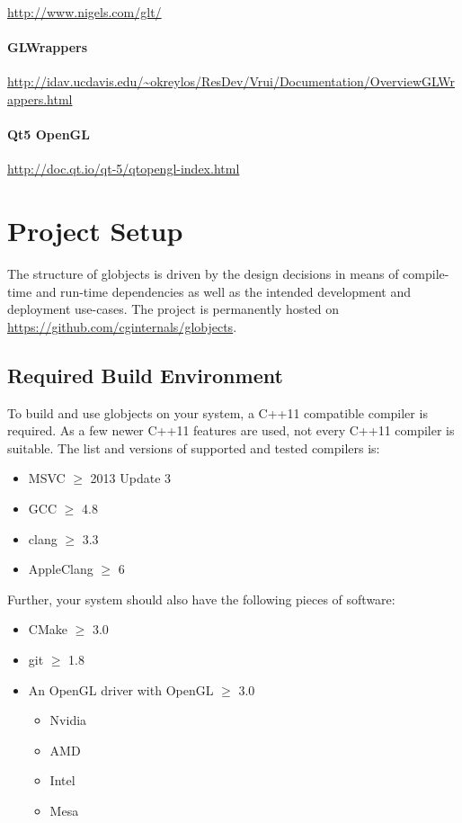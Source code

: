 \documentclass{article}
\begin{document}
\url{http://www.nigels.com/glt/}

\paragraph{GLWrappers}

\url{http://idav.ucdavis.edu/~okreylos/ResDev/Vrui/Documentation/OverviewGLWrappers.html}

\paragraph{Qt5 OpenGL}

\url{http://doc.qt.io/qt-5/qtopengl-index.html}

\section{Project Setup}

The structure of globjects is driven by the design decisions in means of compile-time and run-time dependencies as well as the intended development and deployment use-cases. The project is permanently hosted on \url{https://github.com/cginternals/globjects}.

\subsection{Required Build Environment}

To build and use globjects on your system, a C++11 compatible compiler is required. As a few newer C++11 features are used, not every C++11 compiler is suitable. The list and versions of supported and tested compilers is:
\begin{itemize}
	\item MSVC $\geq$ 2013 Update 3
	\item GCC  $\geq$ 4.8
	\item clang $\geq$ 3.3
	\item AppleClang $\geq$ 6
\end{itemize}
Further, your system should also have the following pieces of software:
\begin{itemize}
	\item CMake $\geq$ 3.0
	\item git $\geq$ 1.8
	\item An OpenGL driver with OpenGL $\geq$ 3.0
	\begin{itemize}
		\item Nvidia
		\item AMD
		\item Intel
		\item Mesa
	\end{itemize}
\end{itemize}
\end{document}
